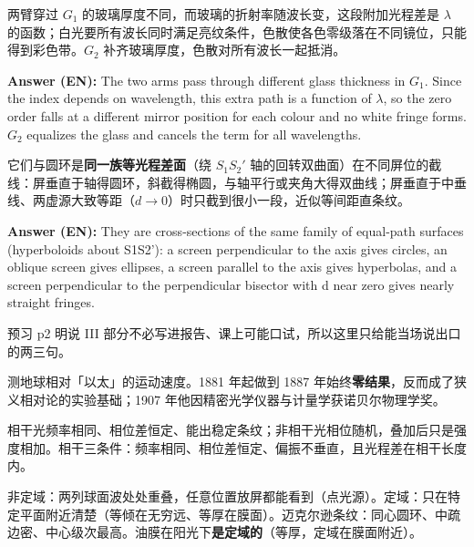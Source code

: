\documentclass[11pt]{ctexart}
\begin{document}
两臂穿过 \(G_1\) 的玻璃厚度不同，而玻璃的折射率随波长变，这段附加光程差是 \(\lambda\) 的函数；白光要所有波长同时满足亮纹条件，色散使各色零级落在不同镜位，只能得到彩色带。\(G_2\) 补齐玻璃厚度，色散对所有波长一起抵消。

\textbf{Answer (EN):} The two arms pass through different glass thickness in $G_1$. Since the index depends on wavelength, this extra path is a function of $\lambda$, so the zero order falls at a different mirror position for each colour and no white fringe forms. $G_2$ equalizes the glass and cancels the term for all wavelengths.


它们与圆环是\textbf{同一族等光程差面}（绕 \(S_1S_2'\) 轴的回转双曲面）在不同屏位的截线：屏垂直于轴得圆环，斜截得椭圆，与轴平行或夹角大得双曲线；屏垂直于中垂线、两虚源大致等距（\(d\to0\)）时只截到很小一段，近似等间距直条纹。

\textbf{Answer (EN):} They are cross-sections of the same family of equal-path surfaces (hyperboloids about S1S2'): a screen perpendicular to the axis gives circles, an oblique screen gives ellipses, a screen parallel to the axis gives hyperbolas, and a screen perpendicular to the perpendicular bisector with d near zero gives nearly straight fringes.


预习 p2 明说 III 部分不必写进报告、课上可能口试，所以这里只给能当场说出口的两三句。


测地球相对「以太」的运动速度。1881 年起做到 1887 年始终\textbf{零结果}，反而成了狭义相对论的实验基础；1907 年他因精密光学仪器与计量学获诺贝尔物理学奖。


相干光频率相同、相位差恒定、能出稳定条纹；非相干光相位随机，叠加后只是强度相加。相干三条件：频率相同、相位差恒定、偏振不垂直，且光程差在相干长度内。


非定域：两列球面波处处重叠，任意位置放屏都能看到（点光源）。定域：只在特定平面附近清楚（等倾在无穷远、等厚在膜面）。迈克尔逊条纹：同心圆环、中疏边密、中心级次最高。油膜在阳光下\textbf{是定域的}（等厚，定域在膜面附近）。
\end{document}
